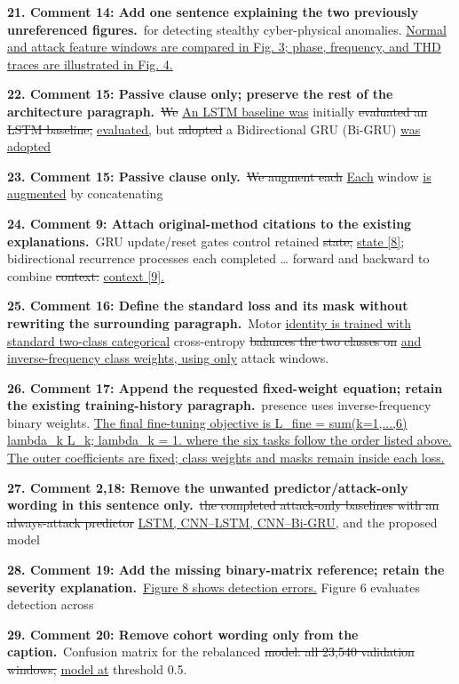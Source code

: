 \documentclass[10pt,letterpaper]{article}
\newcommand{\added}[1]{{\color{blue}\uline{#1}}}
\newcommand{\removed}[1]{{\color{red}\sout{#1}}}
\begin{document}
\textbf{21. Comment 14: Add one sentence explaining the two previously unreferenced figures.}\
for detecting stealthy cyber-physical anomalies. \added{Normal and attack feature windows are compared in Fig. 3; phase, frequency, and THD traces are illustrated in Fig. 4.}\par
\textbf{22. Comment 15: Passive clause only; preserve the rest of the architecture paragraph.}\
\removed{We} \added{An LSTM baseline was} initially \removed{evaluated an LSTM baseline,} \added{evaluated,} but \removed{adopted} a Bidirectional GRU (Bi-GRU) \added{was adopted}\par
\textbf{23. Comment 15: Passive clause only.}\
\removed{We augment each} \added{Each} window \added{is augmented} by concatenating\par
\textbf{24. Comment 9: Attach original-method citations to the existing explanations.}\
GRU update/reset gates control retained \removed{state;} \added{state [8];} bidirectional recurrence processes each completed \ldots{} forward and backward to combine \removed{context.} \added{context [9].}\par
\textbf{25. Comment 16: Define the standard loss and its mask without rewriting the surrounding paragraph.}\
Motor \added{identity is trained with standard two-class categorical} cross-entropy \removed{balances the two classes on} \added{and inverse-frequency class weights, using only} attack windows.\par
\textbf{26. Comment 17: Append the requested fixed-weight equation; retain the existing training-history paragraph.}\
presence uses inverse-frequency binary weights. \added{The final fine-tuning objective is L\_fine = sum(k=1,...,6) lambda\_k L\_k; lambda\_k = 1. where the six tasks follow the order listed above. The outer coefficients are fixed; class weights and masks remain inside each loss.}\par
\textbf{27. Comment 2,18: Remove the unwanted predictor/attack-only wording in this sentence only.}\
\removed{the completed attack-only baselines with an always-attack predictor} \added{LSTM, CNN--LSTM, CNN--Bi-GRU,} and the proposed model\par
\textbf{28. Comment 19: Add the missing binary-matrix reference; retain the severity explanation.}\
\added{Figure 8 shows detection errors.} Figure 6 evaluates detection across\par
\textbf{29. Comment 20: Remove cohort wording only from the caption.}\
Confusion matrix for the rebalanced \removed{model: all 23,540 validation windows,} \added{model at} threshold 0.5.\par
\end{document}

